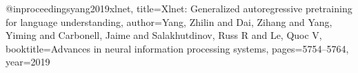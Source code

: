 @inproceedings{yang2019xlnet,
  title={Xlnet: Generalized autoregressive pretraining for language understanding},
  author={Yang, Zhilin and Dai, Zihang and Yang, Yiming and Carbonell, Jaime and Salakhutdinov, Russ R and Le, Quoc V},
  booktitle={Advances in neural information processing systems},
  pages={5754--5764},
  year={2019}
}